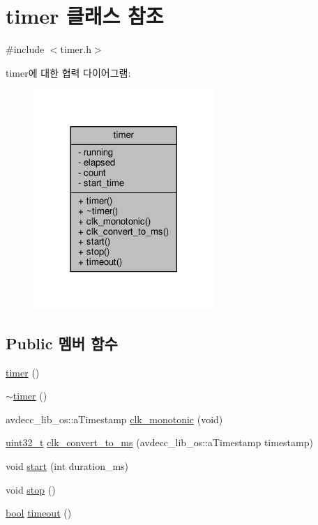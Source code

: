 \hypertarget{classavdecc__lib_1_1timer}{}\section{timer 클래스 참조}
\label{classavdecc__lib_1_1timer}


{\ttfamily \#include $<$timer.\+h$>$}



timer에 대한 협력 다이어그램\+:
\nopagebreak
\begin{figure}[H]
\begin{center}
\leavevmode
\includegraphics[width=194pt]{classavdecc__lib_1_1timer__coll__graph}
\end{center}
\end{figure}
\subsection*{Public 멤버 함수}
\begin{DoxyCompactItemize}
\item 
\hyperlink{classavdecc__lib_1_1timer_a8b8f32aa00c8e58e22bea5c0abf18076}{timer} ()
\item 
\hyperlink{classavdecc__lib_1_1timer_a0bae523609a9ee5996f2f98c243ffcbf}{$\sim$timer} ()
\item 
avdecc\+\_\+lib\+\_\+os\+::a\+Timestamp \hyperlink{classavdecc__lib_1_1timer_ac32ed39b164b2fdb244af2d5adebd44e}{clk\+\_\+monotonic} (void)
\item 
\hyperlink{parse_8c_a6eb1e68cc391dd753bc8ce896dbb8315}{uint32\+\_\+t} \hyperlink{classavdecc__lib_1_1timer_a3fd1591451305bb5fa7854ad07933cf9}{clk\+\_\+convert\+\_\+to\+\_\+ms} (avdecc\+\_\+lib\+\_\+os\+::a\+Timestamp timestamp)
\item 
void \hyperlink{classavdecc__lib_1_1timer_a3ccad652c57dd233f31d40f3d39b8a01}{start} (int duration\+\_\+ms)
\item 
void \hyperlink{classavdecc__lib_1_1timer_a8c528baf37154d347366083f0f816846}{stop} ()
\item 
\hyperlink{avb__gptp_8h_af6a258d8f3ee5206d682d799316314b1}{bool} \hyperlink{classavdecc__lib_1_1timer_aa8795f32f3da0bbd7b3fcefe73818239}{timeout} ()
\end{DoxyCompactItemize}
